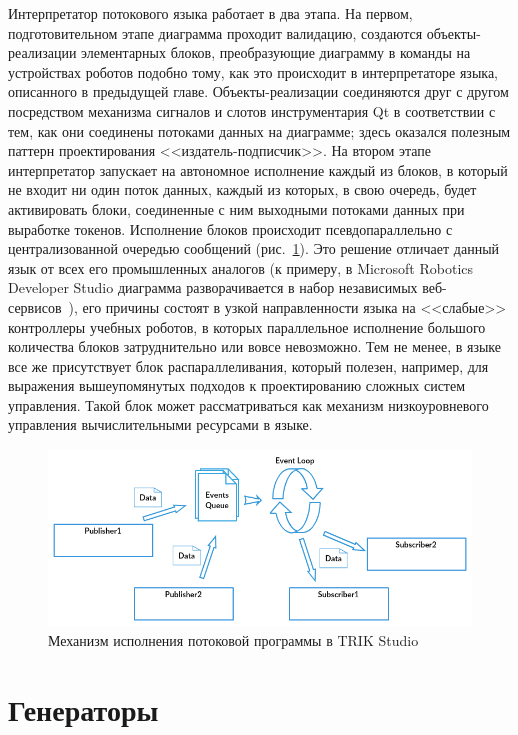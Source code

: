 \documentclass[a5paper]{article}
\begin{document}
Интерпретатор потокового языка работает в два этапа. На первом, подготовительном этапе диаграмма проходит валидацию, создаются объекты-реализации элементарных блоков, преобразующие диаграмму в команды на устройствах роботов подобно тому, как это происходит в интерпретаторе языка, описанного в предыдущей главе. Объекты-реализации соединяются друг с другом посредством механизма сигналов и слотов инструментария Qt в соответствии с тем, как они соединены потоками данных на диаграмме; здесь оказался полезным паттерн проектирования <<издатель-подписчик>>. На втором этапе интерпретатор запускает на автономное исполнение каждый из блоков, в который не входит ни один поток данных, каждый из которых, в свою очередь, будет активировать блоки, соединенные с ним выходными потоками данных при выработке токенов. Исполнение блоков происходит псевдопараллельно с централизованной очередью сообщений (рис.~\ref{image:dsPseudoparallelism}). Это решение отличает данный язык от всех его промышленных аналогов (к примеру, в Microsoft Robotics Developer Studio диаграмма разворачивается в набор независимых веб-сервисов~\cite{jackson2007microsoft}), его причины состоят в узкой направленности языка на <<слабые>> контроллеры учебных роботов, в которых параллельное исполнение большого количества блоков затруднительно или вовсе невозможно. Тем не менее, в языке все же присутствует блок распараллеливания, который полезен, например, для выражения вышеупомянутых подходов к проектированию сложных систем управления. Такой блок может рассматриваться как механизм низкоуровневого управления вычислительными ресурсами в языке.

\begin{figure}[ht]
    \centering
    \includegraphics[width=4.5in]{DF_Interpretation_Process.png}
    \caption{Механизм исполнения потоковой программы в TRIK Studio}
    \label{image:dsPseudoparallelism}
\end{figure}

\section{Генераторы}
\label{chapter:generators}
\end{document}
